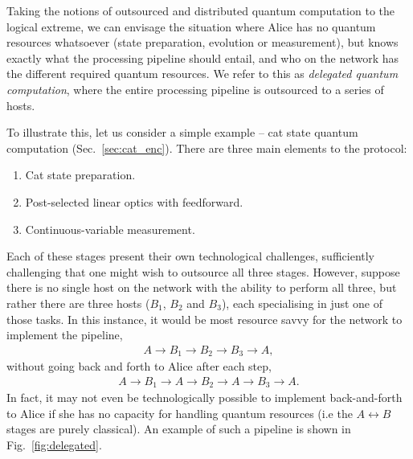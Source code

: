 Taking the notions of outsourced and distributed quantum computation to the logical extreme, we can envisage the situation where Alice has no quantum resources whatsoever (state preparation, evolution or measurement), but knows exactly what the processing pipeline should entail, and who on the network has the different required quantum resources. We refer to this as \textit{delegated quantum computation}, where the entire processing pipeline is outsourced to a series of hosts.

To illustrate this, let us consider a simple example -- cat state quantum computation (Sec.~\ref{sec:cat_enc}). There are three main elements to the protocol:
\begin{enumerate}
\item Cat state preparation.
\item Post-selected linear optics with feedforward.
\item Continuous-variable measurement.
\end{enumerate}

Each of these stages present their own technological challenges, sufficiently challenging that one might wish to outsource all three stages. However, suppose there is no single host on the network with the ability to perform all three, but rather there are three hosts ($B_1$, $B_2$ and $B_3$), each specialising in just one of those tasks. In this instance, it would be most resource savvy for the network to implement the pipeline,
\begin{align}
	A\to B_1\to B_2\to B_3\to A,
\end{align}
without going back and forth to Alice after each step,
\begin{align}
	A\to B_1\to A\to B_2 \to A\to B_3\to A.
\end{align}
In fact, it may not even be technologically possible to implement back-and-forth to Alice if she has no capacity for handling quantum resources (i.e the \mbox{$A\leftrightarrow B$} stages are purely classical). An example of such a pipeline is shown in Fig.~\ref{fig:delegated}.

